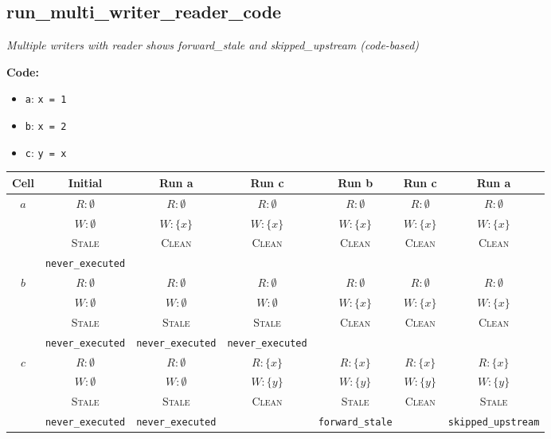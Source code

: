 \documentclass{article}
\begin{document}
\subsection{run\_multi\_writer\_reader\_code}
\textit{Multiple writers with reader shows forward\_stale and skipped\_upstream (code-based)}

\textbf{Code:}
\begin{itemize}
  \item \texttt{a}: \verb|x = 1|
  \item \texttt{b}: \verb|x = 2|
  \item \texttt{c}: \verb|y = x|
\end{itemize}

\begin{center}
\small
\begin{tabular}{|c|c|c|c|c|c|c|}
\hline
\textbf{Cell} & \textbf{Initial} & \textbf{Run a} & \textbf{Run c} & \textbf{Run b} & \textbf{Run c} & \textbf{Run a} \\
\hline
\multirow{4}{*}{$a$}
  & $R: \emptyset$ & $R: \emptyset$ & $R: \emptyset$ & $R: \emptyset$ & $R: \emptyset$ & $R: \emptyset$ \\
  & $W: \emptyset$ & $W: \{x\}$ & $W: \{x\}$ & $W: \{x\}$ & $W: \{x\}$ & $W: \{x\}$ \\
  & \textsc{Stale} & \textsc{Clean} & \textsc{Clean} & \textsc{Clean} & \textsc{Clean} & \textsc{Clean} \\
  & \footnotesize\texttt{never\_executed} &  &  &  &  &  \\
\hline
\multirow{4}{*}{$b$}
  & $R: \emptyset$ & $R: \emptyset$ & $R: \emptyset$ & $R: \emptyset$ & $R: \emptyset$ & $R: \emptyset$ \\
  & $W: \emptyset$ & $W: \emptyset$ & $W: \emptyset$ & $W: \{x\}$ & $W: \{x\}$ & $W: \{x\}$ \\
  & \textsc{Stale} & \textsc{Stale} & \textsc{Stale} & \textsc{Clean} & \textsc{Clean} & \textsc{Clean} \\
  & \footnotesize\texttt{never\_executed} & \footnotesize\texttt{never\_executed} & \footnotesize\texttt{never\_executed} &  &  &  \\
\hline
\multirow{4}{*}{$c$}
  & $R: \emptyset$ & $R: \emptyset$ & $R: \{x\}$ & $R: \{x\}$ & $R: \{x\}$ & $R: \{x\}$ \\
  & $W: \emptyset$ & $W: \emptyset$ & $W: \{y\}$ & $W: \{y\}$ & $W: \{y\}$ & $W: \{y\}$ \\
  & \textsc{Stale} & \textsc{Stale} & \textsc{Clean} & \textsc{Stale} & \textsc{Clean} & \textsc{Stale} \\
  & \footnotesize\texttt{never\_executed} & \footnotesize\texttt{never\_executed} &  & \footnotesize\texttt{forward\_stale} &  & \footnotesize\texttt{skipped\_upstream} \\
\hline
\end{tabular}
\end{center}
\end{document}
